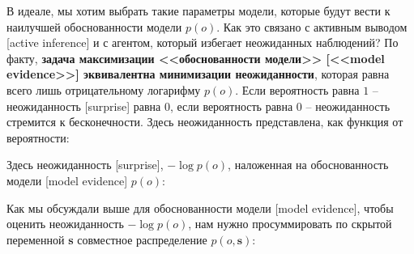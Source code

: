 \documentclass[twoside,leqno, 11pt]{article}
\begin{document}
	В идеале, мы хотим выбрать такие параметры модели, которые будут вести к наилучшей обоснованности модели $p(o)$. Как это связано с активным выводом [active inference] и с агентом, который избегает неожиданных наблюдений? По факту, \textbf{задача максимизации <<обоснованности модели>> [<<model evidence>>] эквивалентна минимизации неожиданности}, которая равна всего лишь отрицательному логарифму $p(o)$. Если вероятность равна $1$ -- неожиданность [surprise] равна $0$, если вероятность равна $0$ -- неожиданность стремится к бесконечности. Здесь неожиданность представлена, как функция от вероятности:
	
	\begin{figure}[h]
		\label{ris:image}
	\end{figure}
	
	Здесь неожиданность [surprise], $-\log p(o)$, наложенная на  обоснованность модели [model evidence] $p(o)$:
	
	\begin{figure}[h!]
		\label{ris:image}
	\end{figure}
	
	Как мы обсуждали выше для обоснованности модели [model evidence], чтобы оценить неожиданность $-\log p(o)$, нам нужно просуммировать по скрытой переменной \textbf{s} совместное распределение $p(o, \textbf{s})$:
	
	\begin{figure}[h!]
		\label{ris:image}
	\end{figure}
	
\end{document}
